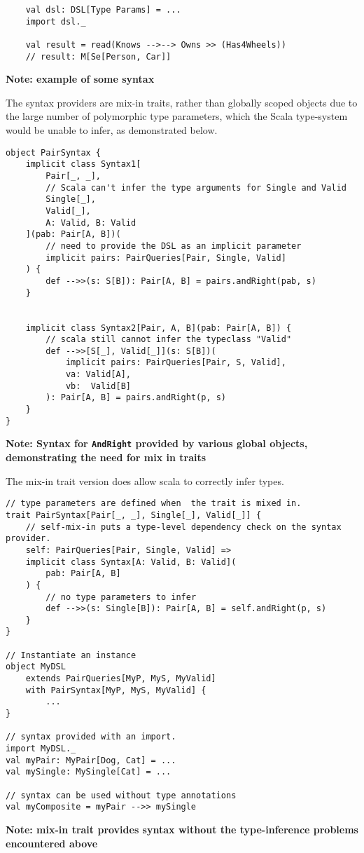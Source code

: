 \documentclass{report}
\newcommand \2[0]{\textbf{2}}
\newcommand \3[0]{\textbf{3}}
\newcommand{\todo}[1]{\textbf{#1}}
\begin{document}
\begin{verbatim}
    val dsl: DSL[Type Params] = ...
    import dsl._

    val result = read(Knows -->--> Owns >> (Has4Wheels))
    // result: M[Se[Person, Car]]
\end{verbatim}
\todo{Note: example of some syntax}

The syntax providers are mix-in traits, rather than globally scoped objects due to the large number of polymorphic type parameters, which the Scala type-system would be unable to infer, as demonstrated below.

\begin{verbatim}
object PairSyntax {
    implicit class Syntax1[
        Pair[_, _], 
        // Scala can't infer the type arguments for Single and Valid
        Single[_], 
        Valid[_], 
        A: Valid, B: Valid
    ](pab: Pair[A, B])(
        // need to provide the DSL as an implicit parameter
        implicit pairs: PairQueries[Pair, Single, Valid]
    ) {
        def -->>(s: S[B]): Pair[A, B] = pairs.andRight(pab, s)
    }
    
    
    implicit class Syntax2[Pair, A, B](pab: Pair[A, B]) {
        // scala still cannot infer the typeclass "Valid"
        def -->>[S[_], Valid[_]](s: S[B])(
            implicit pairs: PairQueries[Pair, S, Valid],
            va: Valid[A],
            vb:  Valid[B]
        ): Pair[A, B] = pairs.andRight(p, s)
    }
}
\end{verbatim}
\todo{Note: Syntax for \texttt{AndRight} provided by various global objects, demonstrating the need for mix in traits}


The mix-in trait version does allow scala to correctly infer types.

\begin{verbatim}
// type parameters are defined when  the trait is mixed in.
trait PairSyntax[Pair[_, _], Single[_], Valid[_]] {
    // self-mix-in puts a type-level dependency check on the syntax provider.
    self: PairQueries[Pair, Single, Valid] => 
    implicit class Syntax[A: Valid, B: Valid](
        pab: Pair[A, B]
    ) {
        // no type parameters to infer
        def -->>(s: Single[B]): Pair[A, B] = self.andRight(p, s)
    }
}

// Instantiate an instance
object MyDSL
    extends PairQueries[MyP, MyS, MyValid] 
    with PairSyntax[MyP, MyS, MyValid] {
        ...
}

// syntax provided with an import.
import MyDSL._
val myPair: MyPair[Dog, Cat] = ...
val mySingle: MySingle[Cat] = ...

// syntax can be used without type annotations
val myComposite = myPair -->> mySingle
\end{verbatim}
\todo{Note: mix-in trait provides syntax without the type-inference problems encountered above}
\end{document}

